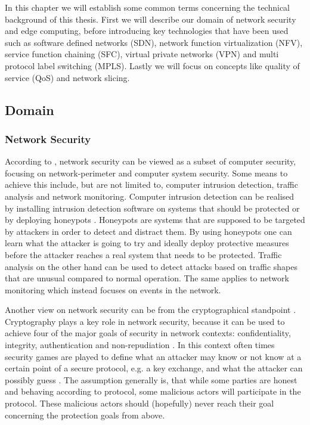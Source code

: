 \documentclass{article}
\begin{document}
\fi
In this chapter we will establish some common terms concerning the technical background of this thesis. First we will describe our domain of network security and edge computing, before introducing key technologies that have been used such as software defined networks (SDN), network function virtualization (NFV), service function chaining (SFC), virtual private networks (VPN) and multi protocol label switching (MPLS). Lastly we will focus on concepts like quality of service (QoS) and network slicing.

\subsection{Domain}
\subsubsection{Network Security}
According to \cite{netsec}, network security can be viewed as a subset of computer security, focusing on network-perimeter and computer system security. Some means to achieve this include, but are not limited to, computer intrusion detection, traffic analysis and network monitoring. Computer intrusion detection can be realised by installing intrusion detection software on systems that should be protected or by deploying honeypots \cite{honeypot}. Honeypots are systems that are supposed to be targeted by attackers in order to detect and distract them. By using honeypots one can learn what the attacker is going to try and ideally deploy protective measures before the attacker reaches a real system that needs to be protected. Traffic analysis on the other hand can be used to detect attacks based on traffic shapes that are unusual compared to normal operation. The same applies to network monitoring which instead focuses on events in the network.

Another view on network security can be from the cryptographical standpoint \cite{netsec}. Cryptography plays a key role in network security, because it can be used to achieve four of the major goals of security in network contexts: confidentiality, integrity, authentication and non-repudiation \cite{cryptography}. In this context often times security games are played to define what an attacker may know or not know at a certain point of a secure protocol, e.g. a key exchange, and what the attacker can possibly guess \cite{games}. The assumption generally is, that while some parties are honest and behaving according to protocol, some malicious actors will participate in the protocol. These malicious actors should (hopefully) never reach their goal concerning the protection goals from above.
\end{document}
